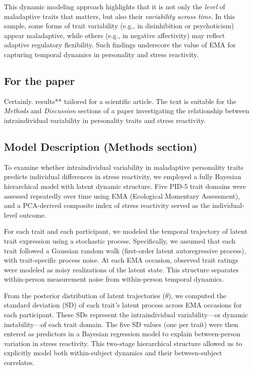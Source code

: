 \documentclass[
  11pt,
  a4paper,
  onecolumn]{article}
\begin{document}
This dynamic modeling approach highlights that it is not only the
\emph{level} of maladaptive traits that matters, but also their
\emph{variability across time}. In this sample, some forms of trait
variability (e.g., in disinhibition or psychoticism) appear maladaptive,
while others (e.g., in negative affectivity) may reflect adaptive
regulatory flexibility. Such findings underscore the value of EMA for
capturing temporal dynamics in personality and stress reactivity.

\subsection{For the paper}\label{for-the-paper}

Certainly. results** tailored for a scientific article. The text is
suitable for the \emph{Methods} and \emph{Discussion} sections of a
paper investigating the relationship between intraindividual variability
in personality traits and stress reactivity.

\subsection{Model Description (Methods
section)}\label{model-description-methods-section}

To examine whether intraindividual variability in maladaptive
personality traits predicts individual differences in stress reactivity,
we employed a fully Bayesian hierarchical model with latent dynamic
structure. Five PID-5 trait domains were assessed repeatedly over time
using EMA (Ecological Momentary Assessment), and a PCA-derived composite
index of stress reactivity served as the individual-level outcome.

For each trait and each participant, we modeled the temporal trajectory
of latent trait expression using a stochastic process. Specifically, we
assumed that each trait followed a Gaussian random walk (first-order
latent autoregressive process), with trait-specific process noise. At
each EMA occasion, observed trait ratings were modeled as noisy
realizations of the latent state. This structure separates within-person
measurement noise from within-person temporal dynamics.

From the posterior distribution of latent trajectories (\(\theta\)), we
computed the standard deviation (SD) of each trait's latent process
across EMA occasions for each participant. These SDs represent the
intraindividual variability---or dynamic instability---of each trait
domain. The five SD values (one per trait) were then entered as
predictors in a Bayesian regression model to explain between-person
variation in stress reactivity. This two-stage hierarchical structure
allowed us to explicitly model both within-subject dynamics and their
between-subject correlates.
\end{document}
